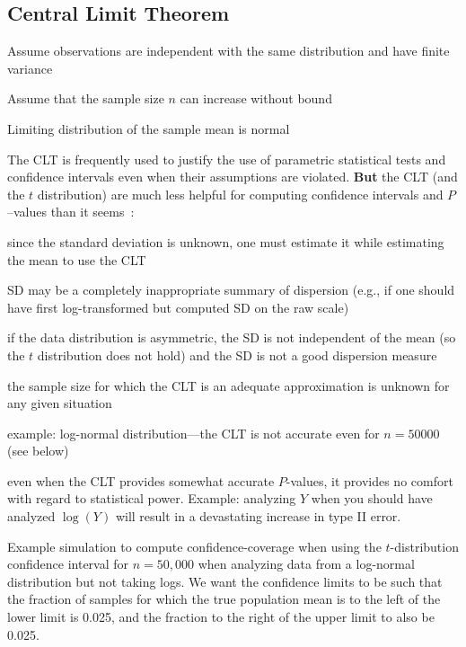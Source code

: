 \subsection{Central Limit Theorem}
\bi
\item Assume observations are independent with the same distribution
  and have finite variance
\item Assume that the sample size $n$ can increase without bound
\item Limiting distribution of the sample mean is normal
\ei

The CLT is frequently used to justify the use of parametric
statistical tests and confidence intervals even when their assumptions
are violated.  \textbf{But} the CLT (and the $t$ distribution) are
much less helpful for computing confidence intervals and $P$--values
than it seems~\cite{wil13avo}: 
\bi
\item since the standard deviation is unknown, one must estimate it
  while estimating the mean to use the CLT
\item SD may be a completely inappropriate summary of dispersion
  (e.g., if one should have first log-transformed but computed SD on
  the raw scale)
\item if the data distribution is asymmetric, the SD is not
  independent of the mean (so the $t$ distribution does not hold) and
  the SD is not a good dispersion measure
\item the sample size for which the CLT is an adequate approximation
  is unknown for any given situation
\item example: log-normal distribution---the CLT is not accurate even
  for $n=50000$ (see below) 
\item even when the CLT provides somewhat accurate $P$-values, it
  provides no comfort with regard to statistical power.  Example:
  analyzing $Y$ when you should have analyzed $\log(Y)$ will result in
  a devastating increase in type II error.
\ei

Example simulation to compute confidence-coverage when using the
$t$-distribution confidence interval for $n=50,000$ when analyzing
data from a log-normal distribution but not taking logs.  We want the
confidence limits to be such that the fraction of samples for which
the true population mean is to the left of the lower limit is 0.025,
and the fraction to the right of the upper limit to also be 0.025.

